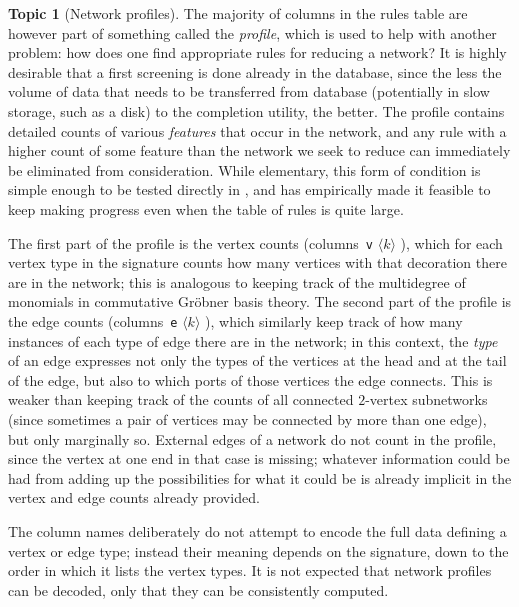 \documentclass{article}
\theoremstyle{definition}
\newtheorem{topic}{Topic}
\newcommand{\meta}[1]{%
   \relax
   \ifmmode
     \langle\text{\normalfont\itshape #1}\rangle%
   \else
     $\langle$\textnormal{\itshape #1}$\rangle$%
   \fi
}
\begin{document}
\begin{topic}[Network profiles]
  The majority of columns in the rules table are however part of 
  something called the \emph{profile}, which is used to help with 
  another problem: how does one find appropriate rules for reducing a 
  network? It is highly desirable that a first screening is done 
  already in the database, since the less the volume of data that 
  needs to be transferred from database (potentially in slow storage, 
  such as a disk) to the completion utility, the better. The profile 
  contains detailed counts of various \emph{features} that occur in the 
  network, and any rule with a higher count of some feature than the 
  network we seek to reduce can immediately be eliminated from 
  consideration. While elementary, this form of condition is simple 
  enough to be tested directly in , and has empirically 
  made it feasible to keep making progress even when the table of 
  rules is quite large.
  
  The first part of the profile is the vertex counts 
  (columns~\texttt{v}\meta{$k$}), which for each vertex type in the 
  signature counts how many vertices with that decoration there are 
  in the network; this is analogous to keeping track of the 
  multidegree of monomials in commutative Gr\"obner basis theory. The 
  second part of the profile is the edge counts 
  (columns~\texttt{e}\meta{$k$}), which similarly keep track of how many 
  instances of each type of edge there are in the network; in this 
  context, the \emph{type} of an edge expresses not only the types of 
  the vertices at the head and at the tail of the edge, but also 
  to which ports of those vertices the edge connects. This is weaker 
  than keeping track of the counts of all connected $2$-vertex 
  subnetworks (since sometimes a pair of vertices may be connected by 
  more than one edge), but only marginally so. External edges of a 
  network do not count in the profile, since the vertex at one end in 
  that case is missing; whatever information could be had from adding 
  up the possibilities for what it could be is already implicit in 
  the vertex and edge counts already provided.
  
  The column names deliberately do not attempt to encode the full 
  data defining a vertex or edge type; instead their meaning depends 
  on the signature, down to the order in which it lists the vertex 
  types. It is not expected that network profiles can be decoded, 
  only that they can be consistently computed.
\end{topic}
\end{document}
